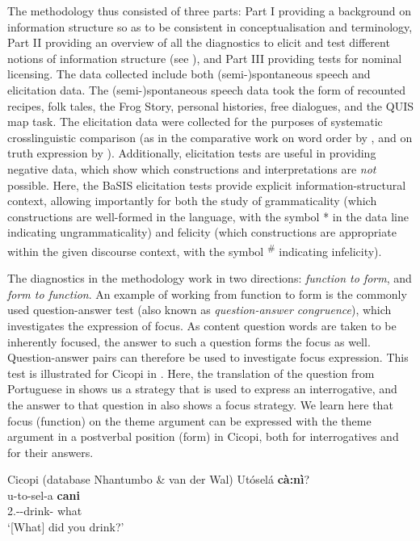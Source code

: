 \documentclass[output=paper]{langscibook}
\begin{document}
The methodology thus consisted of three parts: 
\largerpage
Part I providing a background on information structure so as to be consistent in conceptualisation and terminology, Part II providing an overview of all the diagnostics to elicit and test different notions of information structure (see ), and Part III providing tests for nominal licensing. The data collected include both (semi-)spontaneous speech and elicitation data. The (semi-)spontaneous speech data took the form of recounted recipes, folk tales, the Frog Story, personal histories, free dialogues, and the QUIS map task. The elicitation data were collected for the purposes of systematic crosslinguistic comparison (as in the comparative work on word order by \citealt{KerrEtAl2023}, and on truth expression by \citealt{KerrvanderWal2023}). Additionally, elicitation tests are useful in providing negative data, which show which constructions and interpretations are \textit{not} possible. Here, the BaSIS elicitation tests provide explicit information-structural context, allowing importantly for both the study of grammaticality (which constructions are well-formed in the language, with the symbol * in the data line indicating ungrammaticality) and felicity (which constructions are appropriate within the given discourse context, with the symbol \textsuperscript{\#} indicating infelicity).

The diagnostics in the methodology work in two directions: \textit{function to form}, and \textit{form to function}. An example of working from function to form is the commonly used question-answer test (also known as \textit{question-answer congruence}), which investigates the expression of focus. As content question words are taken to be inherently focused, the answer to such a question forms the focus as well. Question-answer pairs can therefore be used to investigate focus expression. This test is illustrated for Cicopi in . Here, the translation of the question from Portuguese in  shows us a strategy that is used to express an interrogative, and the answer to that question in  also shows a focus strategy. We learn here that focus (function) on the theme argument can be expressed with the theme argument in a postverbal position (form) in Cicopi, both for interrogatives and for their answers.

\ea
\label{bkm:Ref117865183}Cicopi (database Nhantumbo \& van der Wal)
\ea
\label{bkm:Ref117865183:a}
Utóselá \textbf{cà:nì}?\\
\gll
u-to-sel-a  \textbf{cani}\\
2\SG.\SM-\TO{}-drink-\FV{}  what\\
\glt
‘[What]\textsubscript{\FOC} did you drink?’\\
\end{document}
